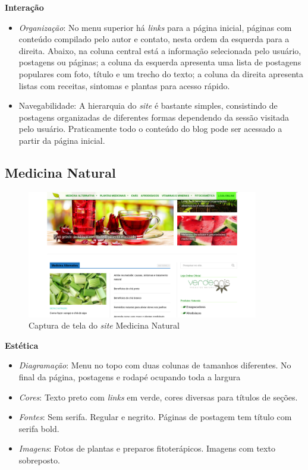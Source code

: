 \textbf{Interação}

\begin{itemize}
\item
  \emph{Organização}: No menu superior há \emph{links} para a página inicial, páginas com conteúdo compilado pelo autor e contato, nesta ordem da esquerda para a direita. Abaixo, na coluna central está a informação selecionada pelo usuário, postagens ou páginas; a coluna da esquerda apresenta uma lista de postagens populares com foto, título e um trecho do texto; a coluna da direita apresenta listas com receitas, sintomas e plantas para acesso rápido.
\item
  Navegabilidade: A hierarquia do \emph{site} é bastante simples, consistindo de postagens organizadas de diferentes formas dependendo da sessão visitada pelo usuário. Praticamente todo o conteúdo do blog pode ser acessado a partir da página inicial.
\end{itemize}

\subsection{Medicina Natural}\label{medicina-natural}

\begin{figure}
\centering
\caption{\label{fig-medicinanatural}Captura de tela do \emph{site} Medicina Natural}
\includegraphics[width=0.9\textwidth]{images/similares/medicinanatural.png}
\end{figure}

\textbf{Estética}

\begin{itemize}
\item
  \emph{Diagramação}: Menu no topo com duas colunas de tamanhos diferentes. No final da página, postagens e rodapé ocupando toda a largura
\item
  \emph{Cores}: Texto preto com \emph{links} em verde, cores diversas para títulos de seções.
\item
  \emph{Fontes}: Sem serifa. Regular e negrito. Páginas de postagem tem título com serifa bold.
\item
  \emph{Imagens}: Fotos de plantas e preparos fitoterápicos. Imagens com texto sobreposto.
\end{itemize}

